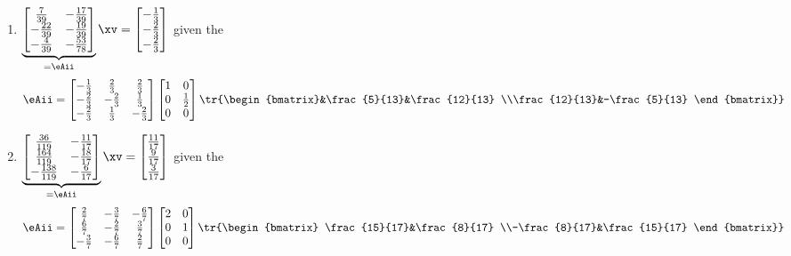 \begin{exercise}
\begin{enumerate}
\item \(\underbrace{\begin{bmatrix} \frac{7}{39}&-\frac{17}{39}
\\-\frac{22}{39}&-\frac{19}{39}
\\-\frac{4}{39}&-\frac{53}{78} \end{bmatrix}}_{=\eAii}\xv
=\begin{bmatrix} -\frac{1}{3}
\\-\frac{2}{3}
\\-\frac{2}{3} \end{bmatrix}\) given the \svd
\begin{equation*}
\eAii=\begin{bmatrix} -\frac{1}{3}&\frac{2}{3}&\frac{2}{3}
\\-\frac{2}{3}&-\frac{2}{3}&\frac{1}{3}
\\-\frac{2}{3}&\frac{1}{3}&-\frac{2}{3} \end{bmatrix}
\begin{bmatrix} 1&0
\\0&\frac{1}{2}
\\0&0 \end{bmatrix}
\tr{\begin{bmatrix}&\frac{5}{13}&\frac{12}{13}
\\\frac{12}{13}&-\frac{5}{13} \end{bmatrix}}
\end{equation*}


\item \(\underbrace{\begin{bmatrix} \frac{36}{119}&-\frac{11}{17}
\\\frac{164}{119}&-\frac{18}{17}
\\-\frac{138}{119}&-\frac{6}{17} \end{bmatrix}}_{=\eAii}\xv
=\begin{bmatrix} \frac{11}{17}
\\\frac{9}{17}
\\\frac{3}{17} \end{bmatrix}\) given the \svd
\begin{equation*}
\eAii=\begin{bmatrix} \frac{2}{7}&-\frac{3}{7}&-\frac{6}{7}
\\\frac{6}{7}&-\frac{2}{7}&\frac{3}{7}
\\-\frac{3}{7}&-\frac{6}{7}&\frac{2}{7} \end{bmatrix}
\begin{bmatrix} 2&0
\\0&1
\\0&0 \end{bmatrix}
\tr{\begin{bmatrix} \frac{15}{17}&\frac{8}{17}
\\-\frac{8}{17}&\frac{15}{17} \end{bmatrix}}
\end{equation*}


\end{enumerate}
\end{exercise}
